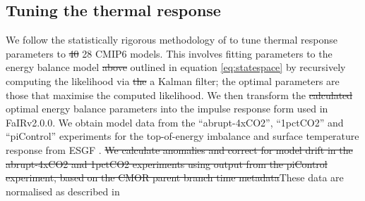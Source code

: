 \documentclass[gmd, manuscript]{copernicus}
\providecommand{\DIFadd}[1]{{\protect\color{blue}#1}} %
\providecommand{\DIFdel}[1]{{\protect\color{red}\sout{#1}}}                      %
\providecommand{\DIFaddbegin}{} %
\providecommand{\DIFaddend}{} %
\providecommand{\DIFdelbegin}{} %
\providecommand{\DIFdelend}{} %
\begin{document}
\subsection{Tuning the thermal response} \label{cmip6_response}
We follow the statistically rigorous methodology of \cite{Cummins2020} to tune thermal response parameters to \DIFdelbegin \DIFdel{40 }\DIFdelend \DIFaddbegin \DIFadd{28 }\DIFaddend CMIP6 models. This involves fitting parameters to the energy balance model \DIFdelbegin \DIFdel{above }\DIFdelend \DIFaddbegin \DIFadd{outlined in equation \ref{eq:statespace} }\DIFaddend by recursively computing the likelihood via \DIFdelbegin \DIFdel{the }\DIFdelend \DIFaddbegin \DIFadd{a }\DIFaddend Kalman filter; the optimal parameters are those that maximise the computed likelihood. We then transform the \DIFdelbegin \DIFdel{calculated }\DIFdelend optimal energy balance parameters into the impulse response form used in FaIRv2.0\DIFaddbegin \DIFadd{.0}\DIFaddend . We obtain model data from the ``abrupt-4xCO2'', ``1pctCO2'' and ``piControl'' experiments for the top-of-energy imbalance and surface temperature response from ESGF \citep{Cinquini2014}. \DIFdelbegin \DIFdel{We calculate anomalies and correct for model drift in the abrupt-4xCO2 and 1pctCO2 experiments using output from the piControl experiment, based on the CMOR parent branch time metadata}\DIFdelend \DIFaddbegin \DIFadd{These data are normalised as described in \mbox{%
\citet{Nicholls2021}}\hspace{0pt}%
}
\end{document}
